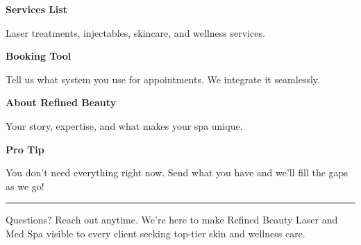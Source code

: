 \documentclass[11pt,letterpaper]{article}
\begin{document}
\hfill
\begin{minipage}[t]{0.48\textwidth}
\begin{tcolorbox}[colframe=accent-teal, boxrule=1pt, left=0.7em, right=0.7em, top=0.5em, bottom=0.5em, arc=4pt, boxsep=0pt]
{\bfseries\small\color{accent-teal}Services List}

\vspace{0.15em}

{\small Laser treatments, injectables, skincare, and wellness services.}
\end{tcolorbox}

\vspace{0.1em}

\begin{tcolorbox}[colframe=accent-teal, boxrule=1pt, left=0.7em, right=0.7em, top=0.5em, bottom=0.5em, arc=4pt, boxsep=0pt]
{\bfseries\small\color{accent-teal}Booking Tool}

\vspace{0.15em}

{\small Tell us what system you use for appointments. We integrate it seamlessly.}
\end{tcolorbox}

\vspace{0.1em}

\begin{tcolorbox}[colframe=accent-teal, boxrule=1pt, left=0.7em, right=0.7em, top=0.5em, bottom=0.5em, arc=4pt, boxsep=0pt]
{\bfseries\small\color{accent-teal}About Refined Beauty}

\vspace{0.15em}

{\small Your story, expertise, and what makes your spa unique.}
\end{tcolorbox}

\vspace{-0.2em}
\end{minipage}

\vspace{0.15em}

\begin{tcolorbox}[colback={accent-red!5}, colframe=accent-red!20, boxrule=0.5pt, left=0.7em, right=0.7em, top=0.4em, bottom=0.4em, arc=6pt, boxsep=0pt]

{\bfseries\small\color{accent-red}Pro Tip}

\vspace{0.1em}

{\small You don't need everything right now. Send what you have and we'll fill the gaps as we go!}

\end{tcolorbox}

\vspace{0.15em}

\noindent\hrule
\vspace{0.2em}

{\small\color{text-light}Questions? Reach out anytime. We're here to make Refined Beauty Laser and Med Spa visible to every client seeking top‑tier skin and wellness care.}
\end{document}
